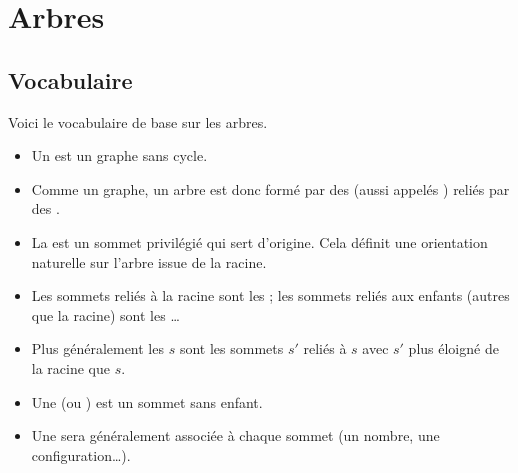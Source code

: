 \documentclass[11pt,class=report,crop=false]{standalone}
\begin{document}









\section{Arbres}


\subsection{Vocabulaire}

Voici le vocabulaire de base sur les arbres.
\begin{itemize}
	\item Un  est un graphe sans cycle.
	\item Comme un graphe, un arbre est donc formé par des  (aussi appelés ) reliés par des .
	\item La  est un sommet privilégié qui sert d'origine. Cela définit une orientation naturelle sur l'arbre issue de la racine.
	\item Les sommets reliés à la racine sont les  ; les sommets reliés aux enfants (autres que la racine) sont les \ldots
	\item Plus généralement les  $s$ sont les sommets  $s'$ reliés à $s$ avec $s'$ plus éloigné de la racine que $s$.
	\item Une  (ou ) est  un sommet sans enfant.
	\item Une  sera généralement associée à chaque sommet (un nombre, une configuration\ldots).
\end{itemize}
\end{document}
